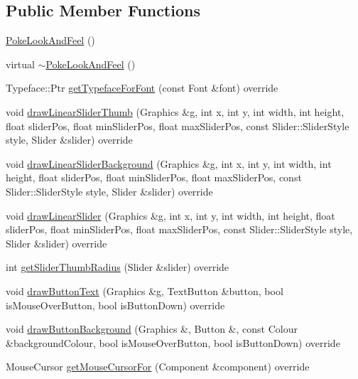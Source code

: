 \subsection*{Public Member Functions}
\begin{DoxyCompactItemize}
\item 
\mbox{\hyperlink{classPokeLookAndFeel_a1b8239c0067249ec2756067ab42bdcad}{Poke\+Look\+And\+Feel}} ()
\item 
virtual \mbox{\hyperlink{classPokeLookAndFeel_a556e4def173a4dffab882c30879b6764}{$\sim$\+Poke\+Look\+And\+Feel}} ()
\item 
Typeface\+::\+Ptr \mbox{\hyperlink{classPokeLookAndFeel_aa031452148cb5c6cb5d4a6c9e6db2fb8}{get\+Typeface\+For\+Font}} (const Font \&font) override
\item 
void \mbox{\hyperlink{classPokeLookAndFeel_adca1055b2300612bfcdd53916c50dcef}{draw\+Linear\+Slider\+Thumb}} (Graphics \&g, int x, int y, int width, int height, float slider\+Pos, float min\+Slider\+Pos, float max\+Slider\+Pos, const Slider\+::\+Slider\+Style style, Slider \&slider) override
\item 
void \mbox{\hyperlink{classPokeLookAndFeel_ab1421aeb40fd8d2126e7497e85c2a331}{draw\+Linear\+Slider\+Background}} (Graphics \&g, int x, int y, int width, int height, float slider\+Pos, float min\+Slider\+Pos, float max\+Slider\+Pos, const Slider\+::\+Slider\+Style style, Slider \&slider) override
\item 
void \mbox{\hyperlink{classPokeLookAndFeel_ac047234a631915cde1ee0a214e397c6a}{draw\+Linear\+Slider}} (Graphics \&g, int x, int y, int width, int height, float slider\+Pos, float min\+Slider\+Pos, float max\+Slider\+Pos, const Slider\+::\+Slider\+Style style, Slider \&slider) override
\item 
int \mbox{\hyperlink{classPokeLookAndFeel_af749b4f0ffd0e97a1e9bfb307fe9e20b}{get\+Slider\+Thumb\+Radius}} (Slider \&slider) override
\item 
void \mbox{\hyperlink{classPokeLookAndFeel_a11362adcae119885bac7d5b4c1a14ce3}{draw\+Button\+Text}} (Graphics \&g, Text\+Button \&button, bool is\+Mouse\+Over\+Button, bool is\+Button\+Down) override
\item 
void \mbox{\hyperlink{classPokeLookAndFeel_a69882eea912fe8a7e830c7dc126585fd}{draw\+Button\+Background}} (Graphics \&, Button \&, const Colour \&background\+Colour, bool is\+Mouse\+Over\+Button, bool is\+Button\+Down) override
\item 
Mouse\+Cursor \mbox{\hyperlink{classPokeLookAndFeel_adbc8e4289093360ca2f7f706039d2ac5}{get\+Mouse\+Cursor\+For}} (Component \&component) override
\end{DoxyCompactItemize}

